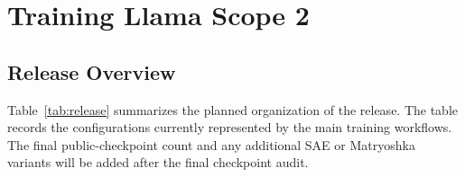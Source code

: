 \documentclass{article}
\begin{document}
\section{Training Llama Scope 2}
\label{sec:training}

\subsection{Release Overview}

Table~\ref{tab:release} summarizes the planned organization of the release.
The table records the configurations currently represented by the main
training workflows. The final public-checkpoint count and any additional SAE
or Matryoshka variants will be added after the final checkpoint audit.

\begin{table}[t]
    \caption{
        Core Llama Scope 2 training configurations. TopK values are per token.
        For JumpReLU Lorsas, $L_0^\star$ is layer-dependent; arrows denote the
        target-$L_0$ schedules from early to deeper layers.
        Each listed configuration is trained layer-wise.
        }
    \centering
    \small
\end{table}
\end{document}
